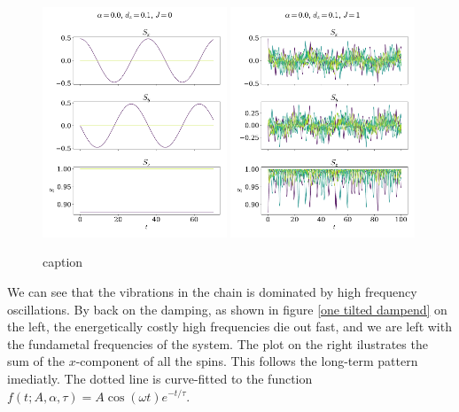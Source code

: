 \documentclass{article}
\begin{document}
    \begin{figure}
        \centering
        \includegraphics[width=0.49\textwidth]{../plots/2221.pdf}
        \includegraphics[width=0.49\textwidth]{../plots/2222.pdf}
        \caption{caption}
        \label{one tilted}
    \end{figure}

    We can see that the vibrations in the chain is dominated by high frequency oscillations. By back on the damping, as shown in figure \ref{one tilted dampend} on the left, the energetically costly high frequencies die out fast, and we are left with the fundametal frequencies of the system. The plot on the right ilustrates the sum of the $x$-component of all the spins. This follows the long-term pattern imediatly. The dotted line is curve-fitted to the function $f(t; A, \alpha, \tau) = A \cos(\omega t) e^{-t/\tau}$.
\end{document}
